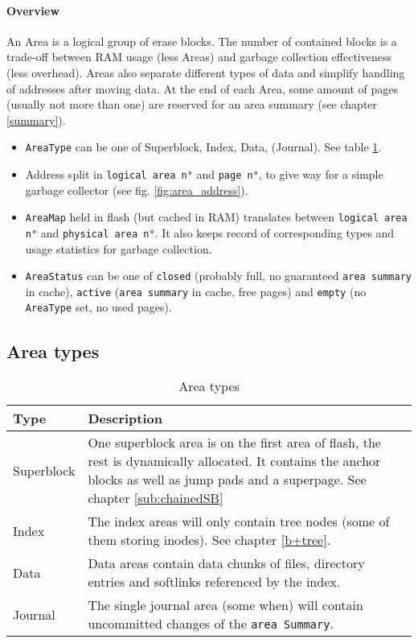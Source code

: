 \paragraph{Overview}
An Area is a logical group of erase blocks. The number of contained blocks is a trade-off between RAM usage (less Areas) and garbage collection effectiveness (less overhead). Areas also separate different types of data and simplify handling of addresses after moving data. At the end of each Area, some amount of pages (usually not more than one) are reserved for an area summary (see chapter \ref{summary}). 
\begin{itemize}
	\item \texttt{AreaType} can be one of Superblock, Index, Data, (Journal). See table \ref{tab:areatypes}.
	\item Address split in \texttt{logical area n°} and \texttt{page n°}, to give way for a simple garbage collector (see  fig. \ref{fig:area_address}).
	\item \texttt{AreaMap} held in flash (but cached in RAM) translates between \texttt{logical area n°} and \texttt{physical area n°}. It also keeps record of corresponding types and usage statistics for garbage collection.
	\item\texttt{AreaStatus} can be one of \texttt{closed} (probably full, no guaranteed \texttt{area summary} in cache), \texttt{active} (\texttt{area summary} in cache, free pages) and \texttt{empty} (no \texttt{AreaType} set, no used pages). 
\end{itemize}

\subsection{Area types}
\begin{table}[htbp]
	\caption{Area types}
	\label{tab:areatypes}
	\begin{tabularx}{\textwidth}{lp{11cm}p{2.5cm}}
		\toprule
		Type & Description\\
		\midrule
		Superblock & One superblock area is on the first area of flash, the rest is dynamically allocated. It contains the anchor blocks as well as jump pads and a superpage. See chapter \ref{sub:chainedSB} \\
		Index & The index areas will only contain tree nodes (some of them storing inodes). See chapter \ref{b+tree}.\\
		Data & Data areas contain data chunks of files, directory entries and softlinks referenced by the index.\\
		Journal & The single journal area (some when) will contain uncommitted changes of the \texttt{area Summary}.\\
		\bottomrule
	\end{tabularx}
\end{table} 

